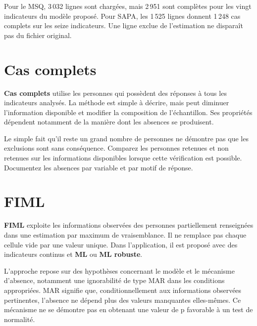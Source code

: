 \documentclass[
  french,
  11pt,
  a4paper,
  DIV=11,
  numbers=noendperiod]{scrreprt}
\begin{document}
Pour le MSQ, 3\,032 lignes sont chargées, mais 2\,951 sont complètes
pour les vingt indicateurs du modèle proposé. Pour SAPA, les 1\,525
lignes donnent 1\,248 cas complets sur les seize indicateurs. Une ligne
exclue de l'estimation ne disparaît pas du fichier original.

\section{Cas complets}\label{cas-complets}

\textbf{Cas complets} utilise les personnes qui possèdent des réponses à
tous les indicateurs analysés. La méthode est simple à décrire, mais
peut diminuer l'information disponible et modifier la composition de
l'échantillon. Ses propriétés dépendent notamment de la manière dont les
absences se produisent.

Le simple fait qu'il reste un grand nombre de personnes ne démontre pas
que les exclusions sont sans conséquence. Comparez les personnes
retenues et non retenues sur les informations disponibles lorsque cette
vérification est possible. Documentez les absences par variable et par
motif de réponse.

\section{FIML}\label{fiml}

\textbf{FIML} exploite les informations observées des personnes
partiellement renseignées dans une estimation par maximum de
vraisemblance. Il ne remplace pas chaque cellule vide par une valeur
unique. Dans l'application, il est proposé avec des indicateurs continus
et \textbf{ML} ou \textbf{ML robuste}.

L'approche repose sur des hypothèses concernant le modèle et le
mécanisme d'absence, notamment une ignorabilité de type MAR dans les
conditions appropriées. MAR signifie que, conditionnellement aux
informations observées pertinentes, l'absence ne dépend plus des valeurs
manquantes elles-mêmes. Ce mécanisme ne se démontre pas en obtenant une
valeur de p favorable à un test de normalité.

\end{document}
